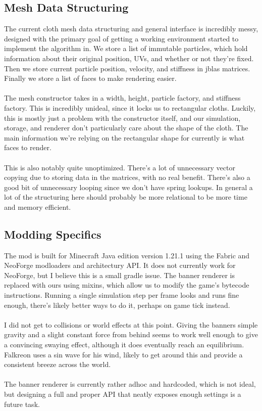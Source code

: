 \documentclass[12pt]{article}
\begin{document}
\subsection{Mesh Data Structuring}

The current cloth mesh data structuring and general interface is incredibly messy, designed with the primary goal of getting a working environment started to implement the algorithm in. We store a list of immutable particles, which hold information about their original position, UVs, and whether or not they're fixed. Then we store current particle position, velocity, and stiffness in jblas matrices. Finally we store a list of faces to make rendering easier.\\
\\
The mesh constructor takes in a width, height, particle factory, and stiffness factory. This is incredibly unideal, since it locks us to rectangular cloths. Luckily, this is mostly just a problem with the constructor itself, and our simulation, storage, and renderer don't particularly care about the shape of the cloth. The main information we're relying on the rectangular shape for currently is what faces to render.\\
\\
This is also notably quite unoptimized. There's a lot of unnecessary vector copying due to storing data in the matrices, with no real benefit. There's also a good bit of unnecessary looping since we don't have spring lookups. In general a lot of the structuring here should probably be more relational to be more time and memory efficient.

\subsection{Modding Specifics}

The mod is built for Minecraft Java edition version 1.21.1 using the Fabric and NeoForge modloaders and architectury API. It does not currently work for NeoForge, but I believe this is a small gradle issue. The banner renderer is replaced with ours using mixins, which allow us to modify the game's bytecode instructions. Running a single simulation step per frame looks and runs fine enough, there's likely better ways to do it, perhaps on game tick instead.\\
\\
I did not get to collisions or world effects at this point. Giving the banners simple gravity and a slight constant force from behind seems to work well enough to give a convincing swaying effect, although it does eventually reach an equilibrium. Falkreon \cite{Falkreon} uses a sin wave for his wind, likely to get around this and provide a consistent breeze across the world.\\
\\
The banner renderer is currently rather adhoc and hardcoded, which is not ideal, but designing a full and proper API that neatly exposes enough settings is a future task.
\end{document}
